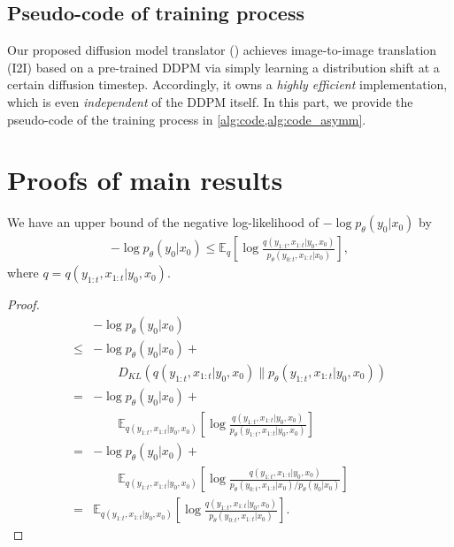 \subsection{Pseudo-code of training process}
Our proposed diffusion model translator (\method) achieves image-to-image translation (I2I) based on a pre-trained DDPM via simply learning a distribution shift at a certain diffusion timestep.
%
Accordingly, it owns a \textit{highly efficient} implementation, which is even \textit{independent} of the DDPM itself.
%
In this part, we provide the pseudo-code of the training process in \cref{alg:code,alg:code_asymm}.
%



\section{Proofs of main results}

\begin{lemma}
We have an upper bound of the negative log-likelihood of $-\log p_{\theta}(y_0|x_0)$ by
%
\begin{align}
-\log p_{\theta}(y_0|x_0)\leqslant\mathbb E_q\left[\log\frac{q(y_{1:t},x_{1:t}|y_0, x_0)}{p_{\theta}(y_{0:t},x_{1:t}|x_0)}\right],
\end{align}
%
where $q=q(y_{1:t},x_{1:t}|y_0, x_0).$
\end{lemma}

\begin{proof}
\begin{align}
&-\log p_{\theta}(y_0|x_0) \\
\leqslant& -\log p_{\theta}(y_0|x_0) + \nonumber \\
& \qquad D_{KL}\left(q(y_{1:t},x_{1:t}|y_0, x_0) \| p_{\theta}(y_{1:t},x_{1:t}|y_0, x_0)\right) \\
=& -\log p_{\theta}(y_0|x_0)+\nonumber  \\
& \qquad \mathbb E_{q(y_{1:t},x_{1:t}|y_0, x_0)}\left[\log\frac{q(y_{1:t},x_{1:t}|y_0, x_0)}{p_{\theta}(y_{1:t},x_{1:t}|y_0, x_0)}\right] \\
=& -\log p_{\theta}(y_0|x_0)+ \nonumber \\
& \qquad \mathbb E_{q(y_{1:t},x_{1:t}|y_0, x_0)}\left[\log\frac{q(y_{1:t},x_{1:t}|y_0, x_0)}{p_{\theta}(y_{0:t},x_{1:t}|x_0)/p_{\theta}(y_0|x_0)}\right] \\
=& \mathbb E_{q(y_{1:t},x_{1:t}|y_0, x_0)}\left[\log\frac{q(y_{1:t},x_{1:t}|y_0, x_0)}{p_{\theta}(y_{0:t},x_{1:t}|x_0)}\right].
\end{align}
\end{proof}

